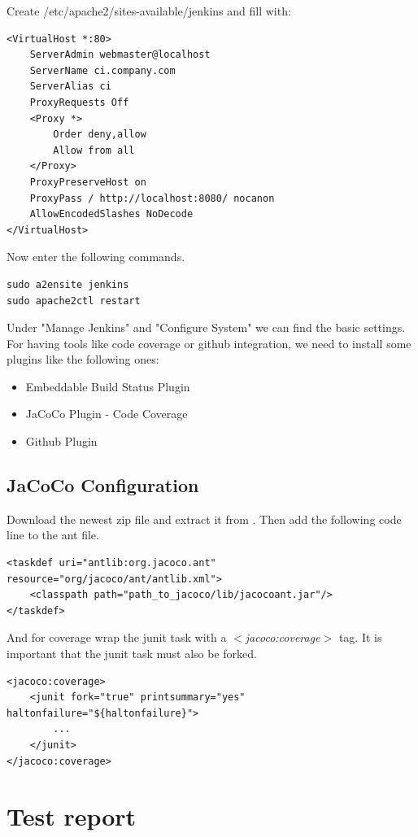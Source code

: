 \documentclass[11pt, a4paper]{article}
\begin{document}
Create /etc/apache2/sites-available/jenkins and fill with:
\begin{lstlisting}
<VirtualHost *:80>
	ServerAdmin webmaster@localhost
	ServerName ci.company.com
	ServerAlias ci
	ProxyRequests Off
	<Proxy *>
		Order deny,allow
		Allow from all
	</Proxy>
	ProxyPreserveHost on
	ProxyPass / http://localhost:8080/ nocanon
	AllowEncodedSlashes NoDecode
</VirtualHost> 
\end{lstlisting}


Now enter the following commands. 

\begin{lstlisting}
sudo a2ensite jenkins
sudo apache2ctl restart
\end{lstlisting}


Under "Manage Jenkins" and "Configure System" we can find the basic settings.
For having tools like code coverage or github integration, we need to install some plugins like the following ones:

\begin{itemize}
\item Embeddable Build Status Plugin
\item JaCoCo Plugin - Code Coverage
\item Github Plugin
\end{itemize}

\subsection{JaCoCo Configuration}

Download the newest zip file and extract it from \cite{jacoco:download}. Then add the following code line to the ant file.

\begin{lstlisting}
<taskdef uri="antlib:org.jacoco.ant" resource="org/jacoco/ant/antlib.xml">
	<classpath path="path_to_jacoco/lib/jacocoant.jar"/>
</taskdef>	   
\end{lstlisting}


And for coverage wrap the junit task with a \textit{$<$jacoco:coverage$>$} tag. It is important that the junit task must also be forked. 
\begin{lstlisting}
<jacoco:coverage>
	<junit fork="true" printsummary="yes" haltonfailure="${haltonfailure}">
		...
	</junit>
</jacoco:coverage>
\end{lstlisting}

\section{Test report}
\end{document}
